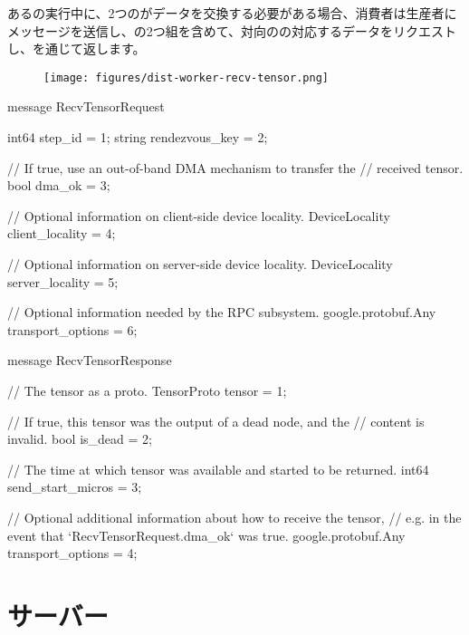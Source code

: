 \begin{content}
あるの実行中に、2つのがデータを交換する必要がある場合、消費者は生産者にメッセージを送信し、の2つ組を含めて、対向のの対応するデータをリクエストし、を通じて返します。

\begin{figure}[H]
\centering
\texttt{[image: figures/dist-worker-recv-tensor.png]}
\caption{}
 \label{fig:dist-worker-recv-tensor}
\end{figure}

\begin{leftbar}
\begin{c++}
message RecvTensorRequest {
  int64 step_id = 1;
  string rendezvous_key = 2;

  // If true, use an out-of-band DMA mechanism to transfer the
  // received tensor.
  bool dma_ok = 3;

  // Optional information on client-side device locality.
  DeviceLocality client_locality = 4;

  // Optional information on server-side device locality.
  DeviceLocality server_locality = 5;

  // Optional information needed by the RPC subsystem.
  google.protobuf.Any transport_options = 6;
}

message RecvTensorResponse {
  // The tensor as a proto.
  TensorProto tensor = 1;

  // If true, this tensor was the output of a dead node, and the
  // content is invalid.
  bool is_dead = 2;

  // The time at which tensor was available and started to be returned.
  int64 send_start_micros = 3;

  // Optional additional information about how to receive the tensor,
  // e.g. in the event that `RecvTensorRequest.dma\_ok` was true.
  google.protobuf.Any transport_options = 4;
}
\end{c++}
\end{leftbar}

\end{content}

\section{サーバー}

